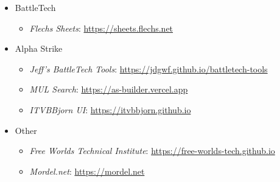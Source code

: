 \begin{itemize}

  \item BattleTech

  \begin{itemize}

    \item \emph{Flechs Sheets}: \href{https://sheets.flechs.net}{https://sheets.flechs.net}

  \end{itemize}

  \item Alpha Strike

  \begin{itemize}

    \item \emph{Jeff's BattleTech Tools}: \href{https://jdgwf.github.io/battletech-tools}{https://jdgwf.github.io/battletech-tools}

    \item \emph{MUL Search}: \href{https://as-builder.vercel.app}{https://as-builder.vercel.app}

    \item \emph{ITVBBjorn UI}: \href{https://itvbbjorn.github.io}{https://itvbbjorn.github.io}

  \end{itemize}

  \item Other

  \begin{itemize}

    \item \emph{Free Worlds Technical Institute}: \href{https://free-worlds-tech.github.io}{https://free-worlds-tech.github.io}

    \item \emph{Mordel.net}: \href{https://mordel.net}{https://mordel.net}

  \end{itemize}

\end{itemize}
